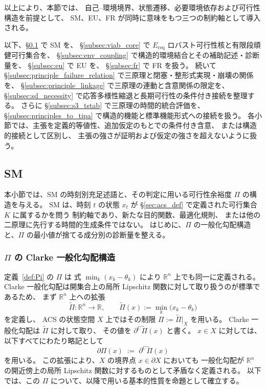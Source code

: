 以上により、本節では、
自己--環境境界、状態遷移、必要環境依存および可行性構造を前提として、
SM、EU、FR が同時に意味をもつ三つの制約軸として導入される。

以下、\S\ref{subsec:sm_foundational} で SM を、
\S\ref{subsec:viab_core} で $E_{\mathrm{req}}$ ロバスト可行性核と有限段頑健可行集合を、
\S\ref{subsec:env_coupling} で構造的環境結合とその補助記述・診断量を、
\S\ref{subsec:eu} で EU を、
\S\ref{subsec:fr} で FR を扱う。
続いて \S\ref{subsec:principle_failure_relation} で三原理と閉塞・整形式実現・崩壊の関係を、
\S\ref{subsec:principle_linkage} で三原理の連動と含意関係の限定を、
\S\ref{subsec:sd_necessity} で応答多様性縮退と長期可行性の条件付き接続を整理する。
さらに \S\ref{subsec:s3_tstab} で三原理の時間的統合評価を、
\S\ref{subsec:principles_to_tipa} で構造的機能と標準機能形式への接続を扱う。
各小節では、主張を定義的等値性、追加仮定のもとでの条件付き含意、
または構造的接続として区別し、
主張の強さが証明および仮定の強さを超えないように扱う。

\subsection{SM}
\label{subsec:sm_foundational}

本小節では、SM の時刻別充足述語と、その判定に用いる可行性余裕度 $\Pi$ の構造を与える。
SM は、時刻 $t$ の状態 $x_t$ が \S\ref{sec:acs_def} で定義された可行集合 $K$ に属するかを問う
制約軸であり、新たな目的関数、最適化規則、
または他の二原理に先行する時間的生成条件ではない。
はじめに、$\Pi$ の一般化勾配構造と、$\Pi$ の最小値が捨てる成分別の診断量を整える。

\subsubsection{$\Pi$ の Clarke 一般化勾配構造}

定義~\ref{def:Pi} の $\Pi$ は
式 $\min_k(x_k-\theta_k)$ により
$\mathbb{R}^n$ 上でも同一に定義される。
Clarke 一般化勾配は開集合上の局所 Lipschitz 関数に対して取り扱うのが標準であるため、
まず $\mathbb{R}^n$ 上への拡張
\[
  \widetilde{\Pi}:\mathbb{R}^n\to\mathbb{R},\qquad \widetilde{\Pi}(x):=\min_k\bigl(x_k-\theta_k\bigr)
\]
を定義し、
ACS の状態空間 $X$ 上ではその制限 $\Pi:=\widetilde{\Pi}|_X$ を用いる。
Clarke 一般化勾配は $\widetilde{\Pi}$ に対して取り、
その値を $\partial^C\widetilde{\Pi}(x)$ と書く。
$x\in X$ に対しては、以下すべてにわたり略記として
\[
  \partial\Pi(x)\;:=\;\partial^C\widetilde{\Pi}(x)
\]
を用いる。
この拡張により、$X$ の境界点 $x\in\partial X$ においても
一般化勾配が $\mathbb{R}^n$ の開近傍上の局所 Lipschitz 関数に対するものとして矛盾なく定義される。
以下では、この $\Pi$ について、以降で用いる基本的性質を命題として確立する。

